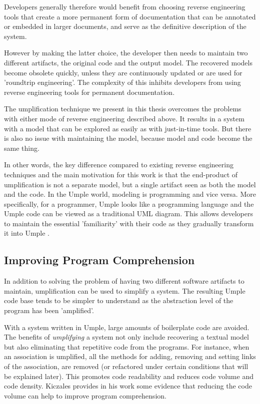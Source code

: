 Developers generally therefore would benefit from choosing reverse engineering tools that create a more permanent form of documentation that can be annotated or embedded in larger documents, and serve as the definitive description of the system. 

However by making the latter choice, the developer then needs to maintain two different artifacts, the original code and the output model. The recovered models become obsolete quickly, unless they are continuously updated or are used for 'roundtrip engineering'.  The complexity of this inhibits developers from using reverse engineering tools for permanent documentation.

The umplification technique we present in this thesis overcomes the problems with either mode of reverse engineering described above. It results in a system with a model that can be explored as easily as with just-in-time tools. But there is also no issue with maintaining the model, because model and code become the same thing.

In other words, the key difference compared to existing reverse engineering techniques and the main motivation for this work is that the end-product of umplification is not a separate model, but a single artifact seen as both the model and the code. In the Umple world, modeling is programming and vice versa. More specifically, for a programmer, Umple looks like a programming language and the Umple code can be viewed as a traditional UML diagram. This allows developers to maintain the essential 'familiarity' with their code as they gradually transform it into Umple \cite{Forward2008}. 

\subsection{Improving Program Comprehension}

In addition to solving the problem of having two different software artifacts to maintain,   umplification can be used to simplify a system. The resulting Umple code base tends to be simpler to understand \cite{UmpleMAIN} as the abstraction level of the program has been 'amplified'.

With a system written in Umple, large amounts of boilerplate code are avoided. The benefits of \textit{umplifying} a system not only include recovering a textual model but also eliminating that repetitive code from the programs. For instance, when an association is umplified, all the methods for adding, removing and setting links of the association, are removed (or refactored under certain conditions that will be explained later). This promotes code readability and reduces code volume and code density. Kiczales provides in his work \cite{kiczalesAOP} some evidence that reducing the code volume can help to improve program comprehension.

